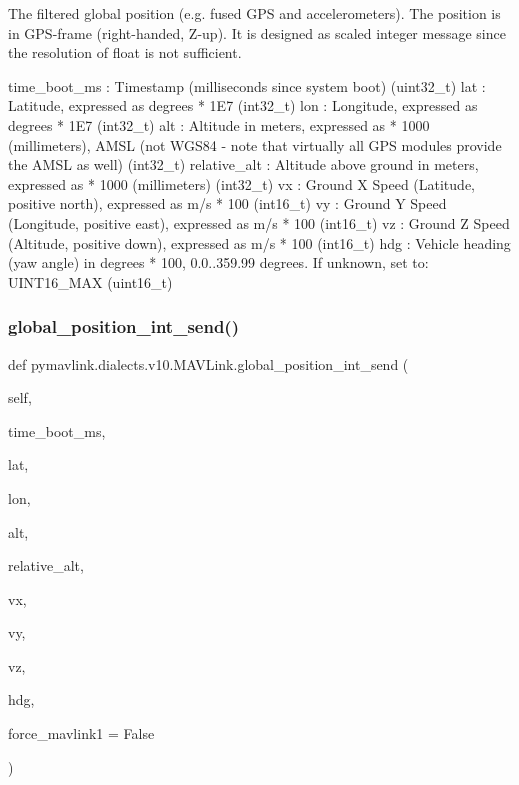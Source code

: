 \begin{DoxyVerb}
\begin{DoxyVerb}
\begin{DoxyVerb}The filtered global position (e.g. fused GPS and accelerometers). The
position is in GPS-frame (right-handed, Z-up). It
is designed as scaled integer message since the
resolution of float is not sufficient.

time_boot_ms              : Timestamp (milliseconds since system boot) (uint32_t)
lat                       : Latitude, expressed as degrees * 1E7 (int32_t)
lon                       : Longitude, expressed as degrees * 1E7 (int32_t)
alt                       : Altitude in meters, expressed as * 1000 (millimeters), AMSL (not WGS84 - note that virtually all GPS modules provide the AMSL as well) (int32_t)
relative_alt              : Altitude above ground in meters, expressed as * 1000 (millimeters) (int32_t)
vx                        : Ground X Speed (Latitude, positive north), expressed as m/s * 100 (int16_t)
vy                        : Ground Y Speed (Longitude, positive east), expressed as m/s * 100 (int16_t)
vz                        : Ground Z Speed (Altitude, positive down), expressed as m/s * 100 (int16_t)
hdg                       : Vehicle heading (yaw angle) in degrees * 100, 0.0..359.99 degrees. If unknown, set to: UINT16_MAX (uint16_t)\end{DoxyVerb}
 \mbox{\label{classpymavlink_1_1dialects_1_1v10_1_1MAVLink_acdcec1ee12e614f8658dd5876e0ae7e2}} 
\subsubsection{\texorpdfstring{global\+\_\+position\+\_\+int\+\_\+send()}{global\_position\_int\_send()}}
{\footnotesize\ttfamily def pymavlink.\+dialects.\+v10.\+M\+A\+V\+Link.\+global\+\_\+position\+\_\+int\+\_\+send (\begin{DoxyParamCaption}\item[{}]{self,  }\item[{}]{time\+\_\+boot\+\_\+ms,  }\item[{}]{lat,  }\item[{}]{lon,  }\item[{}]{alt,  }\item[{}]{relative\+\_\+alt,  }\item[{}]{vx,  }\item[{}]{vy,  }\item[{}]{vz,  }\item[{}]{hdg,  }\item[{}]{force\+\_\+mavlink1 = {\ttfamily False} }\end{DoxyParamCaption})}


\end{DoxyVerb}
\end{DoxyVerb}
